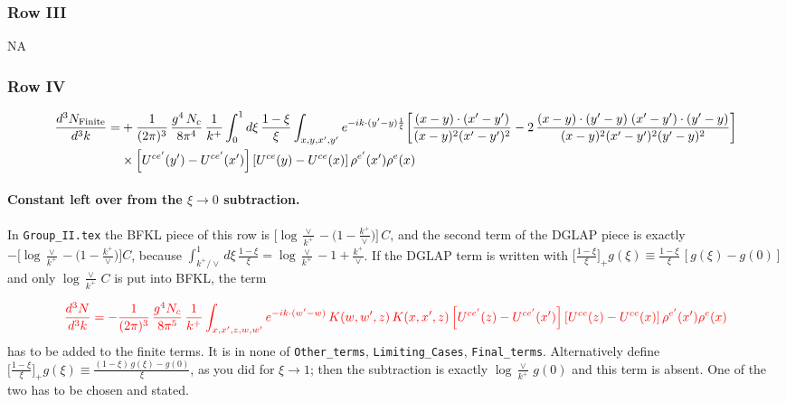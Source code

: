 \documentclass[9pt]{article}
\numberwithin{equation}{section}
\newcommand{\chg}[1]{{\color{red}#1}}
\begin{document}
\subsubsection{Row III}
\textsc{NA}
\subsubsection{Row IV}
\begin{align}
\frac{d^{3}N_{\rm Finite}}{d^{3}k}= &  +\frac{1}{(2\pi)^{3}}\,\frac{g^{4}\,N_{c}}{8\pi^{4}}\,\frac{1}{k^{+}}\int_{0}^{1}d\xi\,\frac{1-\xi}{\xi}\int_{x,y,x',y'}e^{-ik\cdot(y'-y)\frac{1}{\xi}}\bigg[\frac{(x-y)\cdot(x'-y')}{(x-y)^{2}(x'-y')^{2}}-2\,\frac{(x-y)\cdot(y'-y)\;(x'-y')\cdot(y'-y)}{(x-y)^{2}(x'-y')^{2}(y'-y)^{2}}\bigg]\notag\\
&\times\left[U^{ce'}(y') - U^{ce'}(x')\right]\left[U^{ce}(y) - U^{ce}(x)\right]\rho^{e'}(x')\rho^{e}(x)
\end{align}

\chg{\paragraph{Constant left over from the $\xi\to0$ subtraction.} In \texttt{Group\_II.tex} the BFKL piece of this row is $\big[\log\frac{\vee}{k^{+}}-\big(1-\frac{k^{+}}{\vee}\big)\big]\,C$, and the second term of the DGLAP piece is exactly $-\big[\log\frac{\vee}{k^{+}}-\big(1-\frac{k^{+}}{\vee}\big)\big]C$, because $\int_{k^{+}/\vee}^{1}d\xi\,\frac{1-\xi}{\xi}=\log\frac{\vee}{k^{+}}-1+\frac{k^{+}}{\vee}$. If the DGLAP term is written with $\big[\frac{1-\xi}{\xi}\big]_{+}g(\xi)\equiv\frac{1-\xi}{\xi}\,[g(\xi)-g(0)]$ and only $\log\frac{\vee}{k^{+}}\,C$ is put into BFKL, the term}
\begin{align}
\chg{\frac{d^{3}N}{d^{3}k}=-\frac{1}{(2\pi)^{3}}\,\frac{g^{4}N_{c}}{8\pi^{5}}\,\frac{1}{k^{+}}\int_{x,x',z,w,w'}e^{-ik\cdot(w'-w)}\,K(w,w',z)\,K(x,x',z)\left[U^{ce'}(z)-U^{ce'}(x')\right]\left[U^{ce}(z)-U^{ce}(x)\right]\rho^{e'}(x')\rho^{e}(x)}
\end{align}
\chg{has to be added to the finite terms. It is in none of \texttt{Other\_terms}, \texttt{Limiting\_Cases}, \texttt{Final\_terms}. Alternatively define $\big[\frac{1-\xi}{\xi}\big]_{+}g(\xi)\equiv\frac{(1-\xi)\,g(\xi)-g(0)}{\xi}$, as you did for $\xi\to1$; then the subtraction is exactly $\log\frac{\vee}{k^{+}}\,g(0)$ and this term is absent. One of the two has to be chosen and stated.}
\end{document}

